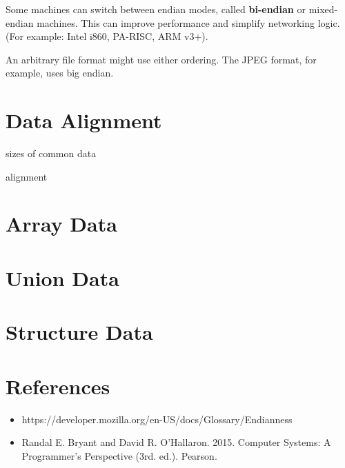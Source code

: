 Some machines can switch between endian modes, called \textbf{bi-endian} or {mixed-endian} machines. This can improve performance and simplify networking logic. (For example: Intel i860, PA-RISC, ARM v3+).

An arbitrary file format might use either ordering. The JPEG format, for example, uses big endian.

\section{Data Alignment}

sizes of common data

alignment

\section{Array Data}

\section{Union Data}

\section{Structure Data}

\section{References}

\begin{itemize}
	\item https://developer.mozilla.org/en-US/docs/Glossary/Endianness
	\item Randal E. Bryant and David R. O'Hallaron. 2015. Computer Systems: A Programmer's Perspective (3rd. ed.). Pearson.
\end{itemize}
